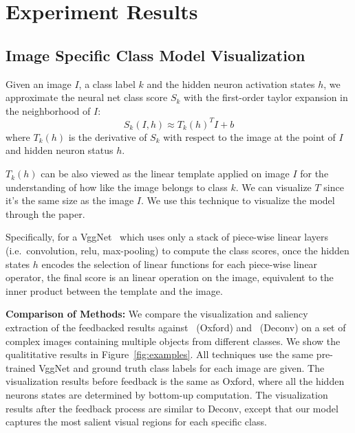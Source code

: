 \section{Experiment Results}
\label{sec:experiment}

\subsection{Image Specific Class Model Visualization}
\label{subsec:visualization}
Given an image $I$, a class label $k$ and the hidden neuron activation states $h$, we approximate the neural net class score $S_k$ with the first-order taylor expansion in the neighborhood of $I$:
\begin{equation}
  S_k(I, h) \approx  T_k(h)^T I + b
\end{equation}
where $T_k(h)$ is the derivative of $S_k$ with respect to the image at the point of $I$ and hidden neuron status $h$.

$T_k(h)$ can be also viewed as the linear template applied on image $I$ for the understanding of how like the image belongs to class $k$. We can visualize $T$ since it's the same size as the image $I$. We use this technique to visualize the model through the paper.

Specifically, for a VggNet~\cite{Simonyan2014Very} which uses only a stack of piece-wise linear layers (i.e.\ convolution, relu, max-pooling) to compute the class scores, once the hidden states $h$ encodes the selection of linear functions for each piece-wise linear operator, the final score is an linear operation on the image, equivalent to the inner product between the template and the image.

\textbf{Comparison of Methods:} We compare the visualization and saliency extraction of the feedbacked results against~\cite{simonyan2013deep} (Oxford) and~\cite{zeiler2014visualizing} (Deconv) on a set of complex images containing multiple objects from different classes. We show the qualititative results in Figure~\ref{fig:examples}. All techniques use the same pre-trained VggNet\cite{Simonyan2014Very} and ground truth class labels for each image are given. The visualization results before feedback is the same as Oxford, where all the hidden neurons states are determined by bottom-up computation. The visualization results after the feedback process are similar to Deconv, except that our model captures the most salient visual regions for each specific class. 

